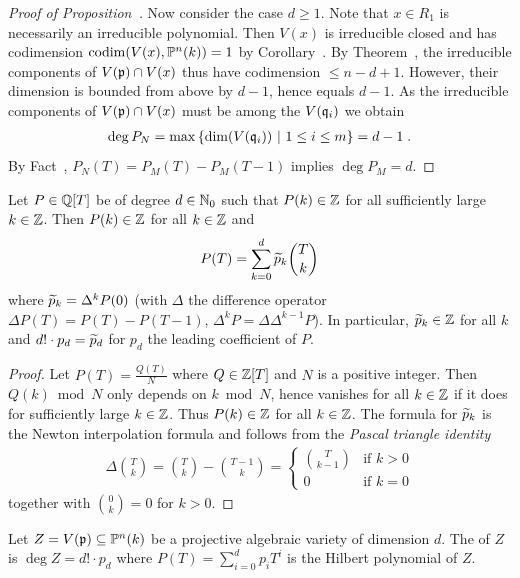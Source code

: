 \documentclass[a4paper,parskip=half,numbers=enddot, DIV=12]{scrreprt}
\begin{document}
\begin{proof}[Proof of Proposition~]
    Now consider the case $d\geq 1$. Note that $x\in R_1$ is necessarily an irreducible polynomial. Then $V(x)$ is irreducible closed and has codimension $\operatorname{codim} (V(x),\mathbb{P}^n(k))=1$ by Corollary~. By Theorem~, the irreducible components of $V(\mathfrak{p})\cap V(x)$ thus have codimension $\leq n-d+1$. However, their dimension is bounded from above by $d-1$, hence equals $d-1$. As the irreducible components of $V(\mathfrak{p})\cap V(x)$ must be among the $V(\mathfrak{q}_i)$ we obtain 
    \begin{align*}
    	\deg P_N=\max\left\{\dim(V(\mathfrak{q}_i))\ \middle|\  1\leq i\leq m\right\} = d-1\;.
    \end{align*}
    By Fact~, $P_N(T) = P_M(T) - P_M(T-1)$ implies $\deg P_M =d$.
\end{proof}
\begin{lem}[a.k.a. Lemma~1] 
    Let $P\in \mathbb{Q}[T]$ be of degree $d\in\mathbb{N}_0$ such that $P(k)\in \mathbb{Z}$ for all sufficiently large $k\in\mathbb{Z}$. Then $P(k) \in \mathbb{Z}$ for all $k\in \mathbb{Z}$ and 
    \begin{align*}
        P(T) = \sum_{k=0}^d \snake p_k \binom Tk
    \end{align*}
    where $\snake p_k = \Delta^kP(0)$ (with $\Delta$ the difference operator $\Delta P(T) = P(T)-P(T-1)$, $\Delta^k P = \Delta \Delta^{k-1} P$). In particular, $\snake p_k\in\IZ$ for all $k$ and $d!\cdot p_d = \snake p_d$ for $p_d$ the leading coefficient of $P$.
\end{lem}
\begin{proof}
    Let $P(T) = \frac{Q(T)}{N}$ where $Q\in \mathbb{Z}[T]$ and $N$ is a positive integer. Then $Q(k)\bmod N$ only depends on $k\bmod N$, hence vanishes for all $k\in \mathbb{Z}$ if it does for sufficiently large $k\in \mathbb{Z}$. Thus $P(k)\in \mathbb{Z}$ for all $k\in \mathbb{Z}$. The formula for $\snake p_k$ is the Newton interpolation formula and follows from the \emph{Pascal triangle identity}
    \begin{align*}
        \Delta \binom Tk= \binom{T}{k}-\binom{T-1}{k}= \begin{cases} \binom T{k-1} & \text{if }k>0\\ 0 &\text{if }k=0 \end{cases}
    \end{align*}
    together with $\binom 0k = 0$ for $k>0$.
\end{proof}
\begin{defi}
    Let $Z= V(\mathfrak{p}) \subseteq \mathbb{P}^n(k)$ be a projective algebraic variety of dimension $d$. The  of $Z$ is $\deg Z=d!\cdot p_d$ where $P(T) = \sum_{i=0}^d p_i T^i$ is the Hilbert polynomial of $Z$.
\end{defi}
\end{document}
